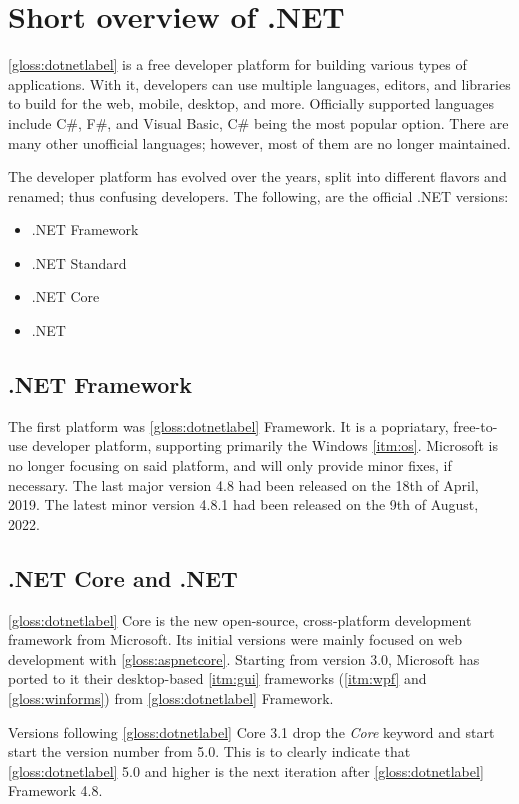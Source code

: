 \chapter{Short overview of .NET}
\ref{gloss:dotnetlabel} is a free developer platform for building various types of applications. With it, developers can use multiple languages, editors, and libraries to build for the web, mobile, desktop, and more.
Officially supported languages include C\#, F\#, and Visual Basic, C\# being the most popular option. There are many other unofficial languages; however, most of them are no longer maintained.

The developer platform has evolved over the years, split into different flavors and renamed; thus confusing developers.
The following, are the official .NET versions:
\begin{itemize}
    \item .NET Framework
    \item .NET Standard
    \item .NET Core
    \item .NET
\end{itemize}

\section{.NET Framework}

The first platform was \ref{gloss:dotnetlabel} Framework. It is a popriatary, free-to-use developer platform, supporting primarily the Windows \ref{itm:os}. Microsoft is no longer focusing on said platform, and will only provide minor fixes, if necessary. The last major version 4.8 had been released on the 18th of April, 2019. The latest minor version 4.8.1 had been released on the 9th of August, 2022.

\section{.NET Core and .NET}

\ref{gloss:dotnetlabel} Core is the new open-source, cross-platform development framework from Microsoft. Its initial versions were mainly focused on web development with \ref{gloss:aspnetcore}. Starting from version 3.0, Microsoft has ported to it their desktop-based \ref{itm:gui} frameworks (\ref{itm:wpf} and \ref{gloss:winforms}) from \ref{gloss:dotnetlabel} Framework.

Versions following \ref{gloss:dotnetlabel} Core 3.1 drop the \textit{Core} keyword and start start the version number from 5.0. This is to clearly indicate that \ref{gloss:dotnetlabel} 5.0 and higher is the next iteration after \ref{gloss:dotnetlabel} Framework 4.8.


